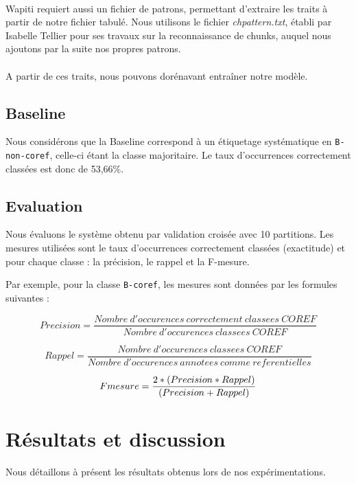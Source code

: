 \documentclass[a4paper,12pt]{article}
\begin{document}
\paragraph{}
Wapiti requiert aussi un fichier de patrons, permettant d'extraire les traits à partir de notre fichier tabulé. Nous utilisons le fichier \emph{chpattern.txt}, établi par Isabelle Tellier pour ses travaux sur la reconnaissance de chunks, auquel nous ajoutons par la suite nos propres patrons.

\paragraph{}
A partir de ces traits, nous pouvons dorénavant entraîner notre modèle.


\subsection{Baseline}

Nous considérons que la Baseline correspond à un étiquetage systématique en \verb!B-non-coref!, celle-ci étant la classe majoritaire.
Le taux d'occurrences correctement classées est donc de 53,66\%.

\subsection{Evaluation}

Nous évaluons le système obtenu par validation croisée avec 10 partitions. Les mesures utilisées sont le taux d'occurrences correctement classées (exactitude) et pour chaque classe : la précision, le rappel et la F-mesure.

Par exemple, pour la classe \verb!B-coref!, les mesures sont données par les formules suivantes :

\[ Precision = \frac{Nombre\ d'occurences\ correctement\ classees\ COREF}{Nombre\ d'occurences\ classees\ COREF} \]

\[ Rappel = \frac{Nombre\ d'occurences\ classees\ COREF}{Nombre\ d'occurences\ annotees\ comme\ referentielles} \]

\[ F\-mesure = \frac{2 * (Precision * Rappel)}{(Precision + Rappel)} \]


\section{Résultats et discussion}

Nous détaillons à présent les résultats obtenus lors de nos expérimentations.
\end{document}
